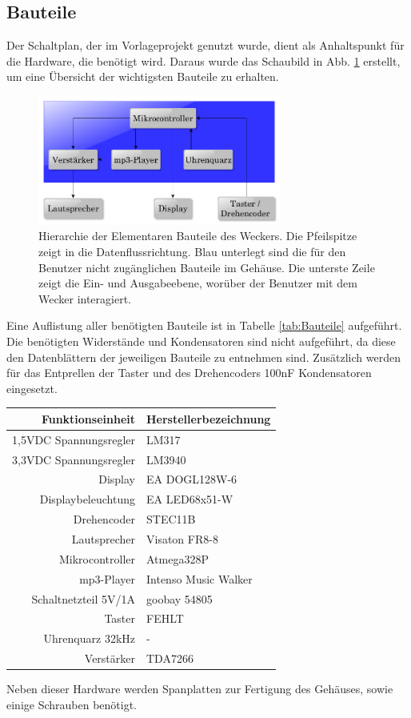 \documentclass[journal, a4paper]{IEEEtran}
\begin{document}
	\subsection{Bauteile}
		\label{sc:Hardware:subsc:Bauteile}
		Der Schaltplan, der im Vorlageprojekt genutzt wurde, dient als Anhaltspunkt für die Hardware, die benötigt wird. Daraus wurde das Schaubild in Abb. \ref{fig:Hierarchie} erstellt, um eine Übersicht der wichtigsten Bauteile zu erhalten.
		\begin{figure}
				\includegraphics[width=80mm]{./Grafiken/Hierarchie}
				\caption{Hierarchie der Elementaren Bauteile des Weckers. Die Pfeilspitze zeigt in die Datenflussrichtung. Blau unterlegt sind die für den Benutzer nicht zugänglichen Bauteile im Gehäuse. Die unterste Zeile zeigt die Ein- und Ausgabeebene, worüber der Benutzer mit dem Wecker interagiert.}
				\label{fig:Hierarchie}
		\end{figure} 
		Eine Auflistung aller benötigten Bauteile ist in Tabelle \ref{tab:Bauteile} aufgeführt. Die benötigten Widerstände und Kondensatoren sind nicht aufgeführt, da diese den Datenblättern der jeweiligen Bauteile zu entnehmen sind. Zusätzlich werden für das Entprellen der Taster und des Drehencoders 100nF Kondensatoren eingesetzt.
		\begin{center}
			\begin{tabular}{rl}
				\toprule
				Funktionseinheit & Herstellerbezeichnung \\
				\midrule
				1,5VDC Spannungsregler & LM317\\
				3,3VDC Spannungsregler & LM3940 \\
				Display & EA DOGL128W-6 \\
				Displaybeleuchtung & EA LED68x51-W\\
				Drehencoder & STEC11B \\
				Lautsprecher & Visaton FR8-8 \\
				Mikrocontroller & Atmega328P \\
				mp3-Player & Intenso Music Walker \\
				Schaltnetzteil 5V/1A & goobay 54805 \\
				Taster & FEHLT \\
				Uhrenquarz 32kHz& - \\			
				Verstärker & TDA7266 \\
				\bottomrule		
			\end{tabular}
			\label{tab:Bauteile}
		\end{center}
		Neben dieser Hardware werden Spanplatten zur Fertigung des Gehäuses, sowie einige Schrauben benötigt.
\end{document}
